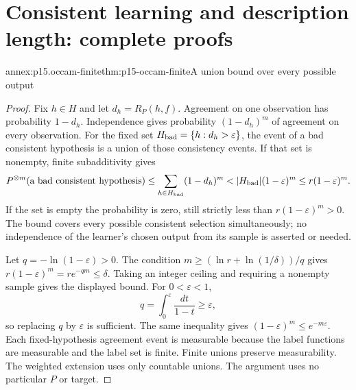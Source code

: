 \section{Consistent learning and description length: complete proofs}
\label{sec:annex-p15-occam-learning}

\begin{annexitem}{annex:p15.occam-finite}{thm:p15-occam-finite}{A union bound over every possible output}
\begin{proof}
Fix \(h\in H\) and let \(d_h=R_P(h,f)\). Agreement on
one observation has probability \(1-d_h\). Independence gives
probability \((1-d_h)^m\) of agreement on every observation.
For the fixed set \(H_{\rm bad}=\{h:d_h>\varepsilon\}\),
the event of a bad consistent hypothesis is a union of those
consistency events. If that set is nonempty, finite subadditivity gives
\[
 P^{\otimes m}(\text{a bad consistent hypothesis})
 \leq\sum_{h\in H_{\rm bad}}(1-d_h)^m
 <|H_{\rm bad}|(1-\varepsilon)^m
 \leq r(1-\varepsilon)^m.
\]
If the set is empty the probability is zero, still strictly
less than \(r(1-\varepsilon)^m>0\).
The bound covers every possible consistent selection
simultaneously; no independence of the learner's chosen
output from its sample is asserted or needed.

Let \(q=-\ln(1-\varepsilon)>0\). The condition
\(m\geq(\ln r+\ln(1/\delta))/q\) gives
\(r(1-\varepsilon)^m=r e^{-qm}\leq\delta\).
Taking an integer ceiling and requiring a nonempty sample
gives the displayed bound. For \(0<\varepsilon<1\),
\[
 q=\int_0^\varepsilon\frac{dt}{1-t}\geq\varepsilon,
\]
so replacing \(q\) by \(\varepsilon\) is sufficient.
The same inequality gives
\((1-\varepsilon)^m\leq e^{-m\varepsilon}\).
Each fixed-hypothesis agreement event is measurable because the
label functions are measurable and the label set is finite.
Finite unions preserve measurability. The weighted extension uses
only countable unions. The argument uses no particular \(P\) or target.
\end{proof}
\end{annexitem}

